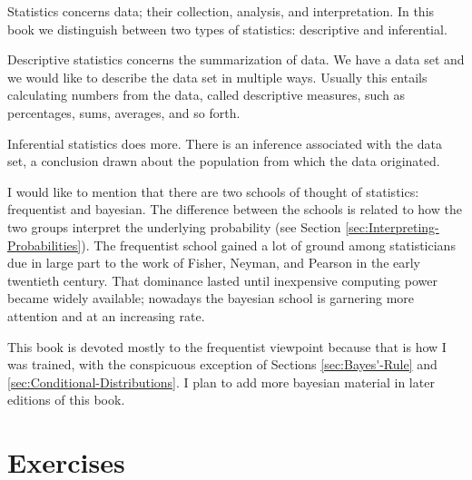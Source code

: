 \documentclass{scrbook}
\begin{document}
Statistics concerns data; their collection, analysis, and interpretation. In this book we distinguish between two types of statistics: descriptive and inferential. 

Descriptive statistics concerns the summarization of data. We have a data set and we would like to describe the data set in multiple ways. Usually this entails calculating numbers from the data, called descriptive measures, such as percentages, sums, averages, and so forth.

Inferential statistics does more. There is an inference associated with the data set, a conclusion drawn about the population from which the data originated.

I would like to mention that there are two schools of thought of statistics: frequentist and bayesian. The difference between the schools is related to how the two groups interpret the underlying probability (see Section \ref{sec:Interpreting-Probabilities}). The frequentist school gained a lot of ground among statisticians due in large part to the work of Fisher, Neyman, and Pearson in the early twentieth century. That dominance lasted until inexpensive computing power became widely available; nowadays the bayesian school is garnering more attention and at an increasing rate.

This book is devoted mostly to the frequentist viewpoint because that is how I was trained, with the conspicuous exception of Sections \ref{sec:Bayes'-Rule} and \ref{sec:Conditional-Distributions}. I plan to add more bayesian material in later editions of this book.

\newpage{}
\section{Exercises}
\label{sec-1-3}

\setcounter{thm}{0}
\end{document}
